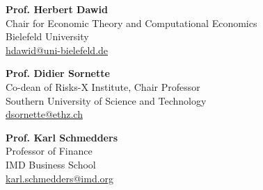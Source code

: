 \documentclass[11pt,a4paper]{article}
\begin{document}
\begin{minipage}[t]{0.5\textwidth}

\textbf{Prof. Herbert Dawid} \\
Chair for Economic Theory and Computational Economics\\
Bielefeld University\\
\href{mailto:hdawid@uni-bielefeld.de}{hdawid@uni-bielefeld.de}
\vspace{1em}

\textbf{Prof. Didier Sornette} \\
Co-dean of Risks-X Institute, Chair Professor \\
Southern University of Science and Technology \\
\href{mailto:dsornette@ethz.ch}{dsornette@ethz.ch} \\
\end{minipage}%
\hfill
\begin{minipage}[t]{0.38\textwidth}
\textbf{Prof. Karl Schmedders} \\
Professor of Finance \\
IMD Business School \\
\href{mailto:karl.schmedders@imd.org}{karl.schmedders@imd.org} \\


\end{minipage}
\end{document}
